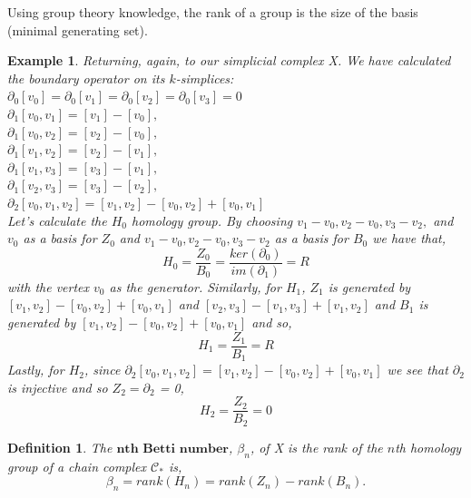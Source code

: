 \documentclass{article}
\newcommand{\be}{\begin{equation}}
\newcommand{\ee}{\end{equation}}
\newtheorem{definition}[theorem]{Definition}
\newtheorem{example}[theorem]{Example}
\begin{document}
Using group theory knowledge, the rank of a group is the size of the basis (minimal generating set).
\begin{example} Returning, again, to our simplicial complex X. We have calculated the boundary operator on its $k$-simplices:\\
$\partial_0[v_0] = \partial_0[v_1]= \partial_0[v_2]= \partial_0[v_3] = 0$ \\
$\partial_1[v_0,v_1] = [v_1] - [v_0],$\\
$\partial_1[v_0,v_2] = [v_2]- [v_0],$ \\
$\partial_1[v_1,v_2] = [v_2] - [v_1],$\\
$\partial_1[v_1,v_3] = [v_3] - [v_1],$\\
$\partial_1[v_2,v_3] = [v_3]- [v_2], $ \\
$\partial_2[v_0,v_1,v_2] = [v_1,v_2] - [v_0,v_2] + [v_0,v_1]$\\
Let's calculate the $H_0$ homology group. By choosing $v_1-v_0, v_2 - v_0, v_3 - v_2,$ and $v_0$ as a basis for $Z_0$ and $v_1-v_0, v_2 - v_0, v_3 - v_2$ as a basis for $B_0$ we have that,\\
\be
H_0 = \frac{Z_0}{B_0} = \frac{ker(\partial_0)}{im(\partial_1)} = R
\ee with the vertex $v_0$ as the generator.
Similarly, for $H_1$, $Z_1$ is generated by $[v_1,v_2] - [v_0,v_2] + [v_0,v_1]$ and $[v_2,v_3] - [v_1,v_3] + [v_1,v_2]$ and $B_1$ is generated by $[v_1,v_2] - [v_0,v_2] + [v_0,v_1]$ and so,
\be
H_1 = \frac{Z_1}{B_1} = R
\ee
Lastly, for $H_2$, since $\partial_2[v_0,v_1,v_2] = [v_1,v_2] - [v_0,v_2] + [v_0,v_1]$ we see that $\partial_2$ is injective and so $Z_2 = \partial_2$ = 0,
\be
H_2 = \frac{Z_2}{B_2}= 0
\ee
\end{example}
\begin{definition}
The $\textbf{nth Betti number}$, $\beta_n$, of X is the rank of the $n$th homology group of a chain complex $\mathcal{C_{*}}$ is,
\be
\beta_n = rank(H_n) = rank(Z_n) - rank(B_n).
\ee
\end{definition}
\end{document}
